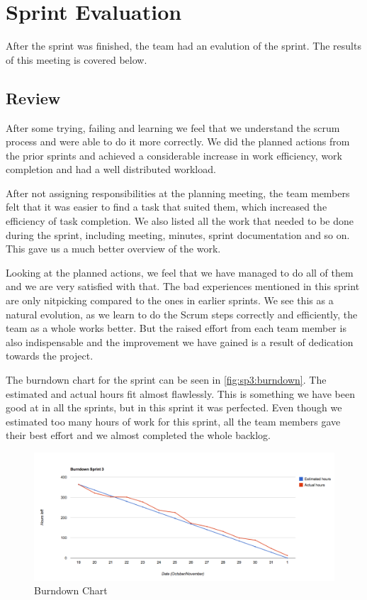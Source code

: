 \section{Sprint Evaluation}
\label{sec:sp3:eval}
After the sprint was finished, the team had an evalution of the sprint. The 
results of this meeting is covered below.

\subsection{Review}
After some trying, failing and learning we feel that we understand the \Gls{scrum} process and were able to do it more correctly. We did the planned actions from the prior sprints and achieved a considerable increase in work efficiency, work completion and had a well distributed workload.

After not assigning responsibilities at the planning meeting, the team members felt that it was easier to find a task that suited them, which increased the efficiency of task completion. We also listed all the work that needed to be done during the sprint, including meeting, minutes, sprint documentation and so on. This gave us a much better overview of the work.

Looking at the planned actions, we feel that we have managed to do all of them and we are very satisfied with that. The bad experiences mentioned in this sprint are only nitpicking compared to the ones in earlier sprints. We see this as a natural evolution, as we learn to do the Scrum steps correctly and efficiently, the team as a whole works better.
But the raised effort from each team member is also indispensable and the improvement we have gained is a result of dedication towards the project.

The burndown chart for the sprint can be seen in \autoref{fig:sp3:burndown}. The estimated and actual hours fit almost flawlessly. This is something we have been good at in all the sprints, but in this sprint it was perfected. Even though we estimated too many hours of work for this sprint, all the team members gave their best effort and we almost completed the whole backlog. 
\begin{figure}[!htb]
	\includegraphics[width=\textwidth]{./sprints/img/burndown_chart_s3}
	\caption{Burndown Chart\label{fig:sp3:burndown}}
\end{figure}

